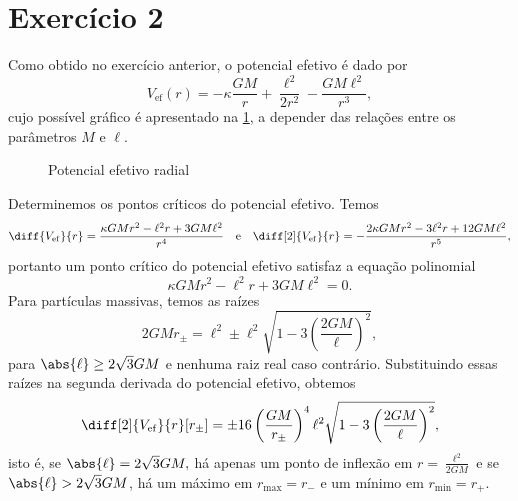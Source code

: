\section*{Exercício 2}
Como obtido no exercício anterior, o potencial efetivo é dado por
\begin{equation*}
    V_\mathrm{ef}(r) = - \kappa \frac{GM}{r} + \frac{\ell^2}{2r^2} - \frac{GM\ell^2}{r^3},
\end{equation*}
cujo possível gráfico é apresentado na \cref{fig:exercício2}, a depender das relações entre os parâmetros \(M\) e \(\ell\).

\begin{figure}[ht]
    \centering
    \caption{Potencial efetivo radial}
    \label{fig:exercício2}
\end{figure}

Determinemos os pontos críticos do potencial efetivo. Temos
\begin{equation*}
    \diff{V_\mathrm{ef}}{r} = \frac{\kappa GM r^2 - \ell^2 r + 3 GM\ell^2}{r^4}\quad\text{e}\quad\diff[2]{V_\mathrm{ef}}{r} = -\frac{2 \kappa GM  r^2 - 3\ell^2r + 12 GM \ell^2}{r^5},
\end{equation*}
portanto um ponto crítico do potencial efetivo satisfaz a equação polinomial
\begin{equation*}
    \kappa GM r^2 - \ell^2r + 3 GM\ell^2 = 0.
\end{equation*}
Para partículas massivas, temos as raízes
\begin{equation*}
    2GM r_{\pm} = \ell^2 \pm \ell^2\sqrt{1 - 3 \left(\frac{2GM}{\ell}\right)^2},
\end{equation*}
para \(\abs{\ell} \geq 2\sqrt{3} GM\) e nenhuma raiz real caso contrário. Substituindo essas raízes na segunda derivada do potencial efetivo, obtemos
\begin{equation*}
    \diff[2]{V_\mathrm{ef}}{r}[r_{\pm}] = \pm16\left(\frac{GM}{r_{\pm}}\right)^4\ell^2\sqrt{1 - 3\left(\frac{2GM}{\ell}\right)^2},
\end{equation*}
isto é, se \(\abs{\ell} = 2\sqrt{3}GM,\) há apenas um ponto de inflexão em \(r = \frac{\ell^2}{2GM}\) e se \(\abs{\ell} > 2\sqrt{3}GM\), há um máximo em \(r_\mathrm{max} = r_-\) e um mínimo em \(r_\mathrm{min}=r_+\).
